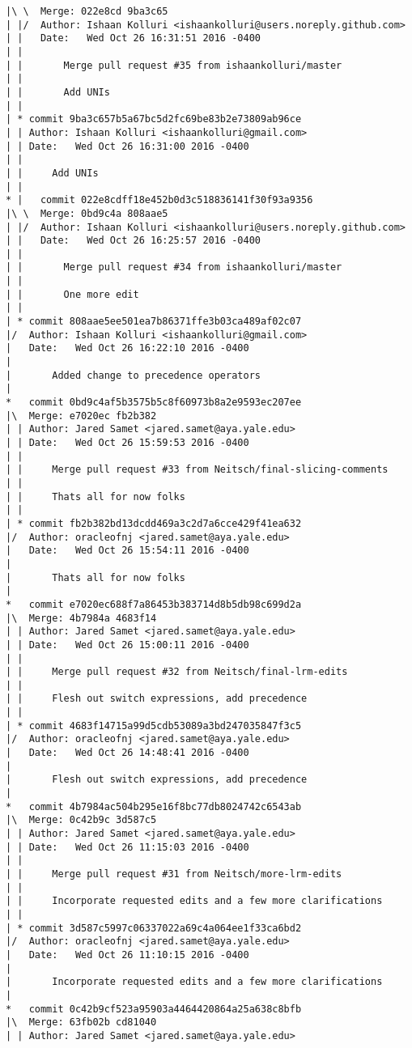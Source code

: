 \begin{lstlisting}
|\ \  Merge: 022e8cd 9ba3c65
| |/  Author: Ishaan Kolluri <ishaankolluri@users.noreply.github.com>
| |   Date:   Wed Oct 26 16:31:51 2016 -0400
| |   
| |       Merge pull request #35 from ishaankolluri/master
| |       
| |       Add UNIs
| |   
| * commit 9ba3c657b5a67bc5d2fc69be83b2e73809ab96ce
| | Author: Ishaan Kolluri <ishaankolluri@gmail.com>
| | Date:   Wed Oct 26 16:31:00 2016 -0400
| | 
| |     Add UNIs
| |     
* |   commit 022e8cdff18e452b0d3c518836141f30f93a9356
|\ \  Merge: 0bd9c4a 808aae5
| |/  Author: Ishaan Kolluri <ishaankolluri@users.noreply.github.com>
| |   Date:   Wed Oct 26 16:25:57 2016 -0400
| |   
| |       Merge pull request #34 from ishaankolluri/master
| |       
| |       One more edit
| |   
| * commit 808aae5ee501ea7b86371ffe3b03ca489af02c07
|/  Author: Ishaan Kolluri <ishaankolluri@gmail.com>
|   Date:   Wed Oct 26 16:22:10 2016 -0400
|   
|       Added change to precedence operators
|    
*   commit 0bd9c4af5b3575b5c8f60973b8a2e9593ec207ee
|\  Merge: e7020ec fb2b382
| | Author: Jared Samet <jared.samet@aya.yale.edu>
| | Date:   Wed Oct 26 15:59:53 2016 -0400
| | 
| |     Merge pull request #33 from Neitsch/final-slicing-comments
| |     
| |     Thats all for now folks
| |   
| * commit fb2b382bd13dcdd469a3c2d7a6cce429f41ea632
|/  Author: oracleofnj <jared.samet@aya.yale.edu>
|   Date:   Wed Oct 26 15:54:11 2016 -0400
|   
|       Thats all for now folks
|    
*   commit e7020ec688f7a86453b383714d8b5db98c699d2a
|\  Merge: 4b7984a 4683f14
| | Author: Jared Samet <jared.samet@aya.yale.edu>
| | Date:   Wed Oct 26 15:00:11 2016 -0400
| | 
| |     Merge pull request #32 from Neitsch/final-lrm-edits
| |     
| |     Flesh out switch expressions, add precedence
| |   
| * commit 4683f14715a99d5cdb53089a3bd247035847f3c5
|/  Author: oracleofnj <jared.samet@aya.yale.edu>
|   Date:   Wed Oct 26 14:48:41 2016 -0400
|   
|       Flesh out switch expressions, add precedence
|    
*   commit 4b7984ac504b295e16f8bc77db8024742c6543ab
|\  Merge: 0c42b9c 3d587c5
| | Author: Jared Samet <jared.samet@aya.yale.edu>
| | Date:   Wed Oct 26 11:15:03 2016 -0400
| | 
| |     Merge pull request #31 from Neitsch/more-lrm-edits
| |     
| |     Incorporate requested edits and a few more clarifications
| |   
| * commit 3d587c5997c06337022a69c4a064ee1f33ca6bd2
|/  Author: oracleofnj <jared.samet@aya.yale.edu>
|   Date:   Wed Oct 26 11:10:15 2016 -0400
|   
|       Incorporate requested edits and a few more clarifications
|    
*   commit 0c42b9cf523a95903a4464420864a25a638c8bfb
|\  Merge: 63fb02b cd81040
| | Author: Jared Samet <jared.samet@aya.yale.edu>

\end{lstlisting}
